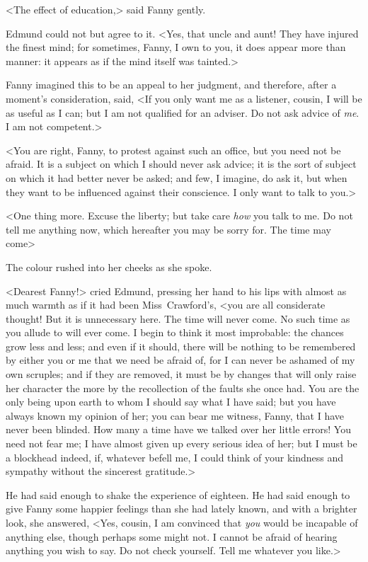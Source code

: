 <The effect of education,> said Fanny gently.

Edmund could not but agree to it. <Yes, that uncle and aunt! They have injured the finest mind; for sometimes, Fanny, I own to you, it does appear more than manner: it appears as if the mind itself was tainted.>

Fanny imagined this to be an appeal to her judgment, and therefore, after a moment's consideration, said, <If you only want me as a listener, cousin, I will be as useful as I can; but I am not qualified for an adviser. Do not ask advice of \textit{me}. I am not competent.>

<You are right, Fanny, to protest against such an office, but you need not be afraid. It is a subject on which I should never ask advice; it is the sort of subject on which it had better never be asked; and few, I imagine, do ask it, but when they want to be influenced against their conscience. I only want to talk to you.>

<One thing more. Excuse the liberty; but take care \textit{how}  you talk to me. Do not tell me anything now, which hereafter you may be sorry for. The time may come\longdash>

The colour rushed into her cheeks as she spoke.

<Dearest Fanny!> cried Edmund, pressing her hand to his lips with almost as much warmth as if it had been Miss~Crawford's, <you are all considerate thought! But it is unnecessary here. The time will never come. No such time as you allude to will ever come. I begin to think it most improbable: the chances grow less and less; and even if it should, there will be nothing to be remembered by either you or me that we need be afraid of, for I can never be ashamed of my own scruples; and if they are removed, it must be by changes that will only raise her character the more by the recollection of the faults she once had. You are the only being upon earth to whom I should say what I have said; but you have always known my opinion of her; you can bear me witness, Fanny, that I have never been blinded. How many a time have we talked over her little errors! You need not fear me; I have almost given up every serious idea of her; but I must be a blockhead indeed, if, whatever befell me, I could think of your kindness and sympathy without the sincerest gratitude.>

He had said enough to shake the experience of eighteen. He had said enough to give Fanny some happier feelings than she had lately known, and with a brighter look, she answered, <Yes, cousin, I am convinced that \textit{you}  would be incapable of anything else, though perhaps some might not. I cannot be afraid of hearing anything you wish to say. Do not check yourself. Tell me whatever you like.>

